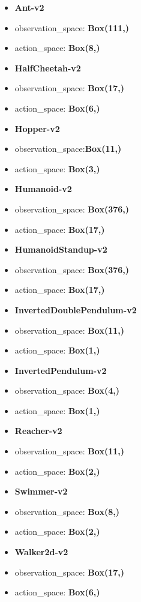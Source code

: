 \documentclass[11pt]{article}
\providecommand{\tightlist}{%
      \setlength{\itemsep}{0pt}\setlength{\parskip}{0pt}}
\begin{document}
\begin{itemize}
\tightlist
\item
  \textbf{Ant-v2}
\item
  observation\_space: \textbf{Box(111,)}
\item
  action\_space: \textbf{Box(8,)}
\item
  \textbf{HalfCheetah-v2}
\item
  observation\_space: \textbf{Box(17,)}
\item
  action\_space: \textbf{Box(6,)}
\item
  \textbf{Hopper-v2}
\item
  observation\_space:\textbf{Box(11,)}
\item
  action\_space: \textbf{Box(3,)}
\item
  \textbf{Humanoid-v2}
\item
  observation\_space: \textbf{Box(376,)}
\item
  action\_space: \textbf{Box(17,)}
\item
  \textbf{HumanoidStandup-v2}
\item
  observation\_space: \textbf{Box(376,)}
\item
  action\_space: \textbf{Box(17,)}
\item
  \textbf{InvertedDoublePendulum-v2}
\item
  observation\_space: \textbf{Box(11,)}
\item
  action\_space: \textbf{Box(1,)}
\item
  \textbf{InvertedPendulum-v2}
\item
  observation\_space: \textbf{Box(4,)}
\item
  action\_space: \textbf{Box(1,)}
\item
  \textbf{Reacher-v2}
\item
  observation\_space: \textbf{Box(11,)}
\item
  action\_space: \textbf{Box(2,)}
\item
  \textbf{Swimmer-v2}
\item
  observation\_space: \textbf{Box(8,)}
\item
  action\_space: \textbf{Box(2,)}
\item
  \textbf{Walker2d-v2}
\item
  observation\_space: \textbf{Box(17,)}
\item
  action\_space: \textbf{Box(6,)}
\end{itemize}
\end{document}
